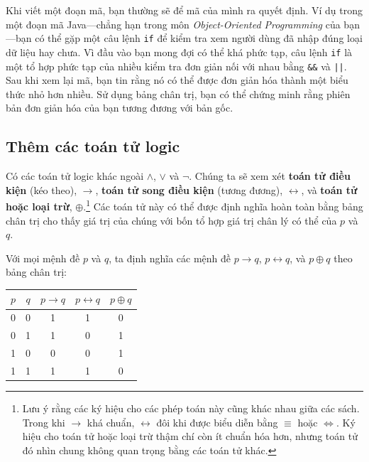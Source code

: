 \begin{notebox}
Khi viết một đoạn mã, bạn thường sẽ để mã của mình ra quyết định. Ví dụ trong một đoạn mã Java---chẳng hạn trong môn \emph{Object-Oriented Programming} của bạn---bạn có thể gặp một câu lệnh \texttt{if} để kiểm tra xem người dùng đã nhập đúng loại dữ liệu hay chưa. Vì đầu vào bạn mong đợi có thể khá phức tạp, câu lệnh \texttt{if} là một tổ hợp phức tạp của nhiều kiểm tra đơn giản nối với nhau bằng \texttt{\&\&} và \texttt{||}. Sau khi xem lại mã, bạn tin rằng nó có thể được đơn giản hóa thành một biểu thức nhỏ hơn nhiều. Sử dụng bảng chân trị, bạn có thể chứng minh rằng phiên bản đơn giản hóa của bạn tương đương với bản gốc.
\end{notebox}

\subsection{Thêm các toán tử logic}

Có các toán tử logic khác ngoài $\land$, $\lor$ và $\lnot$. Chúng ta sẽ xem xét \textbf{toán tử điều kiện} (kéo theo), $\to$, \textbf{toán tử song điều kiện} (tương đương), $\leftrightarrow$, và \textbf{toán tử hoặc loại trừ}, $\oplus$.\footnote{Lưu ý rằng các ký hiệu cho các phép toán này cũng khác nhau giữa các sách. Trong khi $\to$ khá chuẩn, $\leftrightarrow$ đôi khi được biểu diễn bằng $\equiv$ hoặc $\Leftrightarrow$. Ký hiệu cho toán tử hoặc loại trừ thậm chí còn ít chuẩn hóa hơn, nhưng toán tử đó nhìn chung không quan trọng bằng các toán tử khác.} Các toán tử này có thể được định nghĩa hoàn toàn bằng bảng chân trị cho thấy giá trị của chúng với bốn tổ hợp giá trị chân lý có thể của $p$ và $q$.

\begin{definition}
Với mọi mệnh đề $p$ và $q$, ta định nghĩa các mệnh đề $p \to q$, $p \leftrightarrow q$, và $p \oplus q$ theo bảng chân trị:

\begin{center}
\begin{tabular}{cc|ccc}
\hline
$p$ & $q$ & $p \to q$ & $p \leftrightarrow q$ & $p \oplus q$ \\
\hline
0 & 0 & 1 & 1 & 0 \\
0 & 1 & 1 & 0 & 1 \\
1 & 0 & 0 & 0 & 1 \\
1 & 1 & 1 & 1 & 0 \\
\hline
\end{tabular}
\end{center}
\end{definition}

